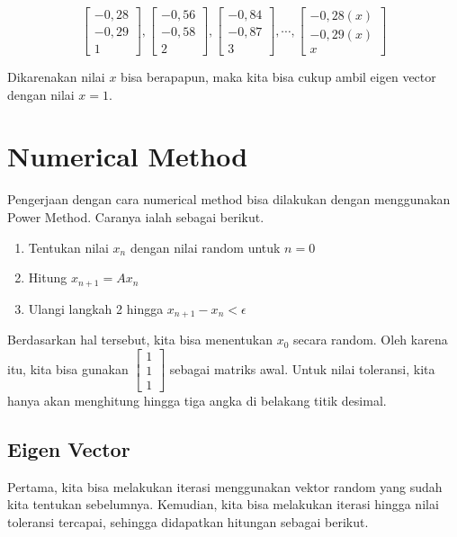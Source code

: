 \documentclass{article}
\begin{document}
$$
\begin{bmatrix}
    -0,28\\
    -0,29\\
    1
\end{bmatrix}
,
\begin{bmatrix}
    -0,56\\
    -0,58\\
    2
\end{bmatrix}
,
\begin{bmatrix}
    -0,84\\
    -0,87\\
    3
\end{bmatrix}
,
\cdots
,
\begin{bmatrix}
    -0,28(x)\\
    -0,29(x)\\
    x
\end{bmatrix}
$$

Dikarenakan nilai $x$ bisa berapapun, maka kita bisa cukup ambil eigen vector dengan nilai $x=1$.

\section{Numerical Method}
Pengerjaan dengan cara numerical method bisa dilakukan dengan menggunakan Power Method. Caranya ialah sebagai berikut.

\begin{enumerate}
    \item Tentukan nilai $x_n$ dengan nilai random untuk $n = 0$
    \item Hitung $x_{n+1} = Ax_n$
    \item Ulangi langkah 2 hingga $x_{n+1} - x_n < \epsilon$
\end{enumerate}

Berdasarkan hal tersebut, kita bisa menentukan $x_0$ secara random. Oleh karena itu, kita bisa gunakan $ \begin{bmatrix} 1  \\ 1  \\ 1  \end{bmatrix} $ sebagai matriks awal. Untuk nilai toleransi, kita hanya akan menghitung hingga tiga angka di belakang titik desimal.

\subsection{Eigen Vector}
Pertama, kita bisa melakukan iterasi menggunakan vektor random yang sudah kita tentukan sebelumnya. Kemudian, kita bisa melakukan iterasi hingga nilai toleransi tercapai, sehingga didapatkan hitungan sebagai berikut.
\end{document}
